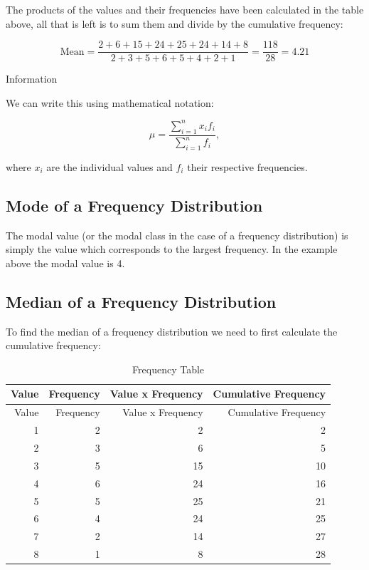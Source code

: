 \documentclass[
]{book}
\begin{document}
The products of the values and their frequencies have been calculated in the table above, all that is left is to sum them and divide by the cumulative frequency:

\[ \textrm{Mean}=\frac{2+6+15+24+25+24+14+8}{2+3+5+6+5+4+2+1}=\frac{118}{28}=4.21 \]

Information

We can write this using mathematical notation:

\[\mu=\frac{\sum_{i=1}^n x_i f_i}{\sum_{i=1}^n f_i},\]

where \(x_i\) are the individual values and \(f_i\) their respective frequencies.

\hypertarget{mode-of-a-frequency-distribution}{%
\subsection{Mode of a Frequency Distribution}\label{mode-of-a-frequency-distribution}}

The modal value (or the modal class in the case of a frequency distribution) is simply the value which corresponds to the largest frequency. In the example above the modal value is 4.

\hypertarget{median-of-a-frequency-distribution}{%
\subsection{Median of a Frequency Distribution}\label{median-of-a-frequency-distribution}}

To find the median of a frequency distribution we need to first calculate the cumulative frequency:

\begin{longtable}[]{@{}rrrr@{}}
\caption{\label{tab:table007} Frequency Table}\tabularnewline
\toprule
Value & Frequency & Value x Frequency & Cumulative Frequency \\
\midrule
\endfirsthead
\toprule
Value & Frequency & Value x Frequency & Cumulative Frequency \\
\midrule
\endhead
1 & 2 & 2 & 2 \\
2 & 3 & 6 & 5 \\
3 & 5 & 15 & 10 \\
4 & 6 & 24 & 16 \\
5 & 5 & 25 & 21 \\
6 & 4 & 24 & 25 \\
7 & 2 & 14 & 27 \\
8 & 1 & 8 & 28 \\
\bottomrule
\end{longtable}
\end{document}
